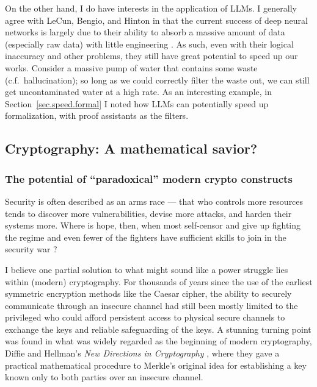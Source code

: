 \documentclass[10pt]{article}
\begin{document}
On the other hand, I do have interests in the application of LLMs. I generally
agree with LeCun, Bengio, and Hinton in that the current success of deep neural
networks is largely due to their ability to absorb a massive amount of data
(especially raw data) with little engineering \cite{2015.deep.learning}.  As
such, even with their logical inaccuracy and other problems, they still have
great potential to speed up our works. Consider a massive pump of water that
contains some waste (c.f.\ hallucination); so long as we could correctly filter
the waste out, we can still get uncontaminated water at a high rate. As an
interesting example, in Section~\ref{sec.speed.formal} I noted how LLMs can
potentially speed up formalization, with proof assistants as the filters. 

\subsection[Cryptography]{Cryptography: A mathematical
savior?\protect\footnotemark}
 \label{sec.crypto}

\subsubsection{The potential of ``paradoxical'' modern crypto constructs}
Security is often described as an arms race --- that who controls more
resources tends to discover more vulnerabilities, devise more attacks, and
harden their systems more. Where is hope, then, when most self-censor and give
up fighting the regime \cite{self.censor.1, self.censor.2, self.censor.3}  and
even fewer of the fighters have sufficient skills to join in the security war
\cite{defenders.lack.skills.1, defenders.lack.skills.2}?

I believe one partial solution to what might sound like a power struggle lies
within (modern) cryptography. For thousands of years since the use of the
earliest symmetric encryption methods like the Caesar cipher, the ability to
securely communicate through an insecure channel had still been mostly limited
to the privileged who could afford persistent access to physical secure
channels to exchange the keys and reliable safeguarding of the keys.  A
stunning turning point was found in what was widely regarded as the beginning
of modern cryptography, Diffie and Hellman's \emph{New Directions in
Cryptography} \cite{new.directions.crypto}, where they gave a practical
mathematical procedure to Merkle's original idea for establishing a key known
only to both parties over an insecure channel.
\end{document}
